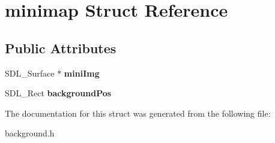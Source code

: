 \hypertarget{structminimap}{}\section{minimap Struct Reference}
\label{structminimap}
\subsection*{Public Attributes}
\begin{DoxyCompactItemize}
\item 
S\+D\+L\+\_\+\+Surface $\ast$ {\bfseries mini\+Img}\hypertarget{structminimap_ab6c3fe959392ffb35c3f92014e0b1e5e}{}\label{structminimap_ab6c3fe959392ffb35c3f92014e0b1e5e}

\item 
S\+D\+L\+\_\+\+Rect {\bfseries background\+Pos}\hypertarget{structminimap_a71e084babf778d2b11c44a2ecbe507ac}{}\label{structminimap_a71e084babf778d2b11c44a2ecbe507ac}

\end{DoxyCompactItemize}


The documentation for this struct was generated from the following file\+:\begin{DoxyCompactItemize}
\item 
background.\+h\end{DoxyCompactItemize}
